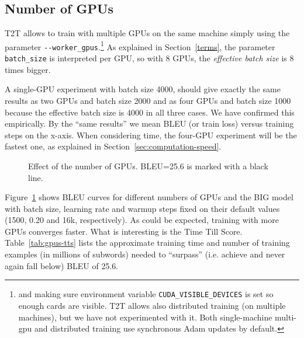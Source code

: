 \documentclass{pbmlarxiv} \pdfoutput=1
\def\Sref#1{Section~\ref{#1}}
\def\Tref#1{Table~\ref{#1}}
\begin{document}
\subsection{Number of GPUs}\label{sec:gpus}

T2T allows to train with multiple GPUs on the same machine
 simply using the parameter \verb|--worker_gpus|.\cprotect\footnote{ %
  and making sure environment variable \verb|CUDA_VISIBLE_DEVICES| is set so enough cards are visible.
  T2T allows also distributed training (on multiple machines),
   but we have not experimented with it.
  Both single-machine multi-gpu and distributed training use synchronous Adam updates by default.
  }
As explained in Section~\ref{terms},
  the parameter \verb|batch_size| is interpreted per GPU,
  so with 8 GPUs, the \textit{effective batch size} is 8 times bigger.

A single-GPU experiment with batch size 4000,
 should give exactly the same results as two GPUs and batch size 2000
 and as four GPUs and batch size 1000
 because the effective batch size is 4000 in all three cases.
We have confirmed this empirically.
By the ``same results'' we mean BLEU (or train loss) versus training steps on the x-axis.
When considering time, the four-GPU experiment will be the fastest one,
 as explained in \Sref{sec:computation-speed}.

\begin{figure}
\vspace{-5mm}
\caption{Effect of the number of GPUs. BLEU=25.6 is marked with a black line.}
\label{fig:gpus-czeng57}
\end{figure}

\bigskip
Figure~\ref{fig:gpus-czeng57} shows BLEU curves for different numbers of GPUs and the BIG model
 with batch size, learning rate and warmup steps fixed on their default values (1500, 0.20 and 16k, respectively).
As could be expected, training with more GPUs converges faster.
What is interesting is the Time Till Score. %
\Tref{tab:gpus-tts} lists
the approximate training time
and number of training examples (in millions of subwords)
needed to ``surpass'' (i.e. achieve and never again fall below) BLEU of 25.6.
\end{document}
